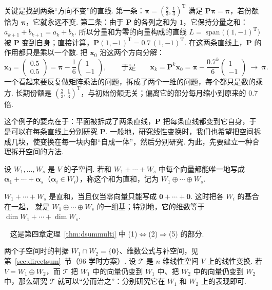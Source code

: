 \documentclass[lang=cn,10.5pt,scheme=chinese,toc=twocol,section,chinesefont=nofont,
twoside,citestyle=gb7714-2015,bibstyle=gb7714-2015]{elegantbook}
\DeclareRobustCommand{\textbf}[1]{{\lnsemiboldlatin\lnsemiboldcjk #1}}
\newcommand{\vv}[1]{\boldsymbol{#1}}
\newcommand{\zero}{\boldsymbol{0}}          %
\newcommand{\trans}{\mathrm{T}}             %
\numberwithin{equation}{section}   %
\newcommand{\spn}{\operatorname{span}}      %
\newcommand*{\lnlabel}[1]{{\sffamily\bfseries\color{black}#1}}
\renewenvironment{proof}{%
	\par\noindent\lnlabel{\proofname}\;\ \color{black!90}\cfs}{\par}
\begin{document}
关键是找到两条“方向不变”的直线. 第一条：$\vv\pi=(\frac23,\frac13)^\trans$ 满足 $\vv P\vv\pi=\vv\pi$，若份额恰为 $\vv\pi$，它就永远不变. 第二条：由于 $\vv P$ 的各列之和为 $1$，它保持分量之和：$a_{k+1}+b_{k+1}=a_k+b_k$. 所以分量和为零的向量构成的直线 $L=\spn\big((1,-1)^\trans\big)$ 被 $\vv P$ 变到自身；直接计算，$\vv P(1,-1)^\trans=0.7\,(1,-1)^\trans$. 在这两条直线上，$\vv P$ 的作用都只是乘以一个数. 把 $\vv x_0$ 沿这两个方向分解：
\[
  \vv x_0=
  \begin{pmatrix}
    0.5 \\0.5
  \end{pmatrix}
  =\vv\pi-\frac16
  \begin{pmatrix}
    1 \\-1
  \end{pmatrix}
  ,\qquad\text{于是}\qquad
  \vv x_k=\vv P^k\vv x_0=\vv\pi-\frac{0.7^k}6
  \begin{pmatrix}
    1 \\-1
  \end{pmatrix}
  \ \longrightarrow\ \vv\pi.
\]
一个看起来要反复做矩阵乘法的问题，拆成了两个一维的问题，每个都只是数的乘方. 长期份额是 $(\frac23,\frac13)^\trans$，与初始份额无关；偏离它的部分每月缩小到原来的 $0.7$ 倍.

这个例子的要点在于：平面被拆成了两条直线，$\vv P$ 把每条直线都变到它自身，于是可以在每条直线上分别研究 $\vv P$. 一般地，研究线性变换时，我们也希望把空间拆成几块，使变换在每一块内部“自成一体”，然后分别研究. 为此，先要建立一种合理拆开空间的方法.

\begin{definition}
  \label{def:dsum}
  设 $W_1,\ldots,W_s$ 是 $V$ 的子空间. 若和 $W_1+\cdots+W_s$ 中每个向量都能\textbf{唯一地}写成
  $\vv\alpha_1+\cdots+\vv\alpha_s$（$\vv\alpha_i\in W_i$），称这个和为\textbf{直和}，记为 $W_1\oplus\cdots\oplus W_s$.
\end{definition}

\begin{proposition}
  \label{prop:dsum}
  $W_1+\cdots+W_s$ 是直和，当且仅当零向量只能写成 $\zero+\cdots+\zero$. 这时把各 $W_i$ 的基合在一起，
  就是 $W_1\oplus\cdots\oplus W_s$ 的一组基；特别地，它的维数等于 $\dim W_1+\cdots+\dim W_s$.
\end{proposition}
\begin{proof}
  这是第四章定理~\ref{thm:dsummulti} 中 (1)$\Leftrightarrow$(2)$\Rightarrow$(5) 的部分.%
\end{proof}

两个子空间时的判据 $W_1\cap W_2=\{\zero\}$、维数公式与补空间，见第~\ref{sec:directsum}~节（96 学时方案）.%
设 $\mathscr T$ 是 $n$ 维线性空间 $V$ 上的线性变换. 若 $V=W_1\oplus W_2$，而 $\mathscr T$ 把 $W_1$ 中的向量仍变到 $W_1$ 中、把 $W_2$ 中的向量仍变到 $W_2$ 中，那么研究 $\mathscr T$ 就可以“分而治之”：分别研究它在 $W_1$ 和 $W_2$ 上的表现即可.
\end{document}
